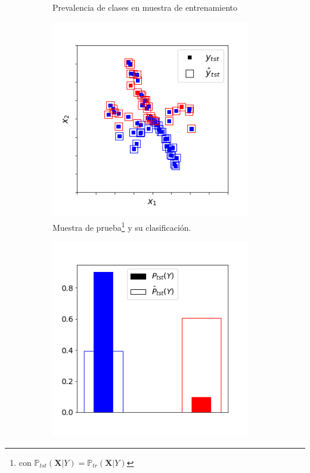\begin{figure}[H]
\begin{subfigure}[t]{0.36\textwidth}
        \caption{Prevalencia de clases en muestra de
        entrenamiento}\label{cambios:prevalencia_tr}
    \end{subfigure}
    \medskip
    \begin{subfigure}[t]{0.36\textwidth}
        \centering
        \includegraphics[width=0.95\textwidth]{../plots_teoria/cambios_test_scatterplot.png}
        \caption{Muestra de prueba\footnote{con
        $\mathbb{P}_{tst}(\boldsymbol{X}|Y) =
        \mathbb{P}_{tr}(\boldsymbol{X}|Y)$} y su
        clasificación.}\label{cambios:clasificacion_tst}
    \end{subfigure}
    \hfill
    \begin{subfigure}[t]{0.36\textwidth}
        \centering
        \includegraphics[width=0.95\textwidth]{../plots_teoria/cambios_test_barplot.png}

\end{subfigure}
\end{figure}
